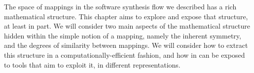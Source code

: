 The space of mappings in the software synthesis flow we described has a rich mathematical structure. This chapter aims to explore and expose that structure, at least in part. We will consider two main aspects of the mathematical structure hidden within the simple notion of a mapping, namely the inherent symmetry, and the degrees of similarity between mappings. We will consider how to extract this structure in a computationally-efficient fashion, and how in can be exposed to tools that aim to exploit it, in different representations.
